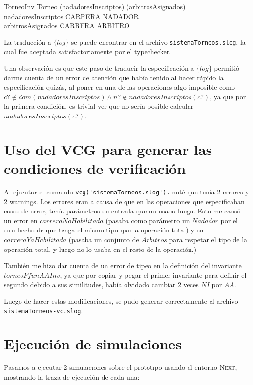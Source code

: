 \documentclass{article}
\begin{document}
\begin{schema}{TorneoInv}
Torneo
\where
\dom(nadadoresInscriptos) \subseteq \dom(arbitrosAsignados) \\
nadadoresInscriptos \in CARRERA \pfun \power NADADOR \\
arbitrosAsignados \in CARRERA \pfun \power ARBITRO
\end{schema}

La traducción a $\{log\}$ se puede encontrar en el archivo \verb|sistemaTorneos.slog|, la cual fue aceptada satisfactoriamente
por el typechecker.

Una observación es que este paso de traducir la especificación a $\{log\}$ permitió
darme cuenta de un error de atención que había tenido al hacer rápido la especificación quizás,
al poner en una de las operaciones algo imposible como $c? \notin dom(nadadoresInscriptos) \land n? \notin nadadoresInscriptos(c?)$,
ya que por la primera condición, es trivial ver que no sería posible calcular $nadadoresInscriptos(c?)$.

\section*{Uso del VCG para generar las condiciones de verificación}

Al ejecutar el comando \verb|vcg('sistemaTorneos.slog').| noté que tenía 2 errores y 2 warnings.
Los errores eran a causa de que en las operaciones que especificaban
casos de error, tenía parámetros de entrada que no usaba luego. Esto 
me causó un error en $carreraNoHabilitada$ (pasaba como parámetro un $Nadador$ por 
el solo hecho de que tenga el mismo tipo que la operación total) y en $carreraYaHabilitada$
(pasaba un conjunto de $Arbitros$ para respetar el tipo de la operación
total, y luego no lo usaba en el resto de la operación.)

También me hizo dar cuenta de un error de tipeo en la definición del invariante $torneoPfunAAInv$,
ya que por copiar y pegar el primer invariante para definir el segundo debido a sus similitudes, había olvidado cambiar 2 veces
$NI$ por $AA$.

Luego de hacer estas modificaciones, se pudo generar correctamente el archivo 
\verb|sistemaTorneos-vc.slog|.

\section*{Ejecución de simulaciones}

Pasamos a ejecutar 2 simulaciones sobre el prototipo usando el entorno \textsc{Next}, mostrando
la traza de ejecución de cada una:
\end{document}
